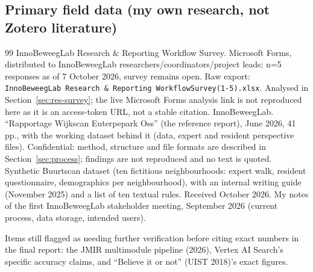 \subsection*{Primary field data (my own research, not Zotero literature)}
\begin{thebibliography}{99}
\setcounter{enumiv}{55}
 InnoBeweegLab Research \& Reporting Workflow Survey. Microsoft Forms, distributed to InnoBeweegLab researchers/coordinators/project leads; n=5 responses as of 7 October 2026, survey remains open. Raw export: \texttt{InnoBeweegLab Research \& Reporting WorkflowSurvey(1-5).xlsx}. Analysed in Section~\ref{sec:res-survey}; the live Microsoft Forms analysis link is not reproduced here as it is an access-token URL, not a stable citation.
 InnoBeweegLab. \textquotedblleft{}Rapportage Wijkscan Euterpepark Oss\textquotedblright{} (the reference report), June 2026, 41 pp., with the working dataset behind it (data, expert and resident perspective files). Confidential: method, structure and file formats are described in Section~\ref{sec:process}; findings are not reproduced and no text is quoted.
 Synthetic Buurtscan dataset (ten fictitious neighbourhoods: expert walk, resident questionnaire, demographics per neighbourhood), with an internal writing guide (November 2025) and a list of ten textual rules. Received October 2026.
 My notes of the first InnoBeweegLab stakeholder meeting, September 2026 (current process, data storage, intended users).
\end{thebibliography}

Items still flagged as needing further verification before citing exact numbers in the final report: the JMIR multimodule pipeline (2026), Vertex AI Search's specific accuracy claims, and \textquotedblleft{}Believe it or not\textquotedblright{} (UIST 2018)'s exact figures.
